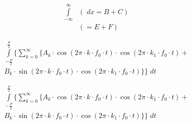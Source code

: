 \documentclass[11pt,a4paper]{article}
\begin{document}
\begin{equation*}
\begin{aligned}
\int\limits_{-\infty}^{\infty} & \left( \;dx = B+C \right)\\
& \left( = E+F \right)
\end{aligned}
\end{equation*}

\vspace{2cm}

\begin{equation*}
\begin{aligned}
\int\limits_{-\frac{P}{2}}^{\frac{P}{2}}
\left.\Bigg\lbrace\sum_{k=0}^{\infty}\left.\big\lbrace\right.\right.\!\!A_{k}\cdot\cos(2\pi\cdot{}k\cdot{}f_{0}\cdot{}t)\cdot\cos(2\pi\cdot{}k_{1}\cdot{}f_{0}\cdot{}t)+\\
\left.\left.B_{k}\cdot\sin(2\pi\cdot{}k\cdot{}f_{0}\cdot{}t)\cdot\cos(2\pi\cdot{}k_{1}\cdot{}f_{0}\cdot{}t)\right.\big\rbrace\right.\Bigg\rbrace{}\;dt
\end{aligned}
\end{equation*}

\vspace{2cm}


\begin{equation*}
\begin{aligned}
\int\limits_{-\frac{P}{2}}^{\frac{P}{2}}
\left.\Bigg\lbrace\sum_{k=0}^{\infty}\left.\big\lbrace{}A_{k}\cdot\cos(2\pi\cdot{}k\cdot{}f_{0}\cdot{}t)\cdot\cos(2\pi\cdot{}k_{1}\cdot{}f_{0}\cdot{}t)+\right.\right.\\
\left.\left.B_{k}\cdot\sin(2\pi\cdot{}k\cdot{}f_{0}\cdot{}t)\cdot\cos(2\pi\cdot{}k_{1}\cdot{}f_{0}\cdot{}t)\right.\big\rbrace\right.\Bigg\rbrace{}\;dt
\end{aligned}
\end{equation*}
\end{document}
